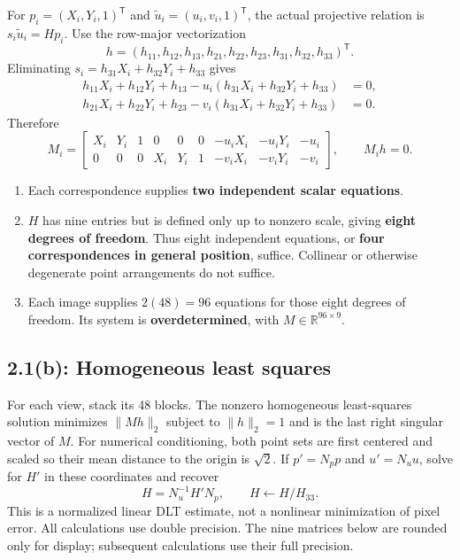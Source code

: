 \documentclass[10pt,letterpaper]{article}
\newcommand{\R}{\mathbb{R}}
\newcommand{\T}{^{\mathsf T}}
\begin{document}
For $p_i=(X_i,Y_i,1)\T$ and $\tilde u_i=(u_i,v_i,1)\T$, the actual projective
relation is $s_i\tilde u_i=Hp_i$. Use the row-major vectorization
\[
h=(h_{11},h_{12},h_{13},h_{21},h_{22},h_{23},h_{31},h_{32},h_{33})\T.
\]
Eliminating $s_i=h_{31}X_i+h_{32}Y_i+h_{33}$ gives
\begin{align*}
h_{11}X_i+h_{12}Y_i+h_{13}-u_i(h_{31}X_i+h_{32}Y_i+h_{33})&=0,\\
h_{21}X_i+h_{22}Y_i+h_{23}-v_i(h_{31}X_i+h_{32}Y_i+h_{33})&=0.
\end{align*}
Therefore
\begin{equation}
\boxed{M_i=\begin{bmatrix}
X_i&Y_i&1&0&0&0&-u_iX_i&-u_iY_i&-u_i\\
0&0&0&X_i&Y_i&1&-v_iX_i&-v_iY_i&-v_i
\end{bmatrix},\qquad M_ih=0.}
\end{equation}
\begin{enumerate}
\item Each correspondence supplies \textbf{two independent scalar equations}.
\item $H$ has nine entries but is defined only up to nonzero scale, giving
\textbf{eight degrees of freedom}. Thus eight independent equations,
or \textbf{four correspondences in general position}, suffice. Collinear
or otherwise degenerate point arrangements do not suffice.
\item Each image supplies $2(48)=96$ equations for those eight degrees of
freedom. Its system is \textbf{overdetermined}, with $M\in\R^{96\times9}$.
\end{enumerate}

\subsection*{2.1(b): Homogeneous least squares}
For each view, stack its 48 blocks. The nonzero homogeneous least-squares
solution minimizes $\|Mh\|_2$ subject to $\|h\|_2=1$ and is the last right
singular vector of $M$. For numerical conditioning, both point sets are
first centered and scaled so their mean distance to the origin is $\sqrt2$.
If $p'=N_pp$ and $u'=N_uu$, solve for $H'$ in these coordinates and recover
\[
H=N_u^{-1}H'N_p,\qquad H\leftarrow H/H_{33}.
\]
This is a normalized linear DLT estimate, not a nonlinear minimization of
pixel error. All calculations use double precision. The nine matrices below
are rounded only for display; subsequent calculations use their full precision.
\end{document}
